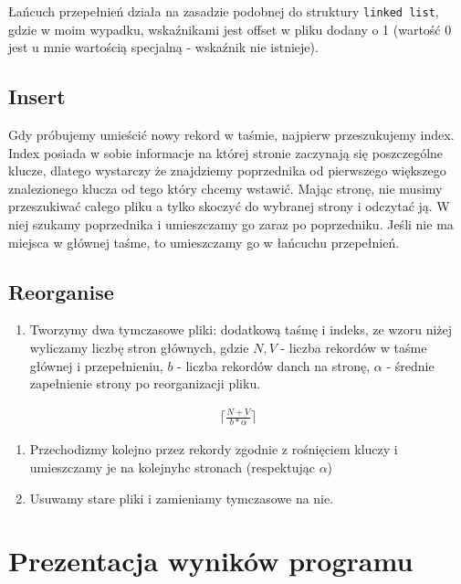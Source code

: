 \documentclass[
]{article}
\providecommand{\tightlist}{%
  \setlength{\itemsep}{0pt}\setlength{\parskip}{0pt}}
\begin{document}
Łańcuch przepełnień działa na zasadzie podobnej do struktury
\texttt{linked\ list}, gdzie w moim wypadku, wskaźnikami jest offset w
pliku dodany o 1 (wartość 0 jest u mnie wartością specjalną - wskaźnik
nie istnieje).

\subsection{Insert}\label{insert}

Gdy próbujemy umieścić nowy rekord w taśmie, najpierw przeszukujemy
index. Index posiada w sobie informacje na której stronie zaczynają się
poszczególne klucze, dlatego wystarczy że znajdziemy poprzednika od
pierwszego większego znalezionego klucza od tego który chcemy wstawić.
Mając stronę, nie musimy przeszukiwać całego pliku a tylko skoczyć do
wybranej strony i odczytać ją. W niej szukamy poprzednika i umieszczamy
go zaraz po poprzedniku. Jeśli nie ma miejsca w głównej taśme, to
umieszczamy go w łańcuchu przepełnień.

\subsection{Reorganise}\label{reorganise}

\begin{enumerate}
\def\labelenumi{\arabic{enumi}.}
\tightlist
\item
  Tworzymy dwa tymczasowe pliki: dodatkową taśmę i indeks, ze wzoru
  niżej wyliczamy liczbę stron głównych, gdzie \(N,V\) - liczba rekordów
  w taśme głównej i przepełnieniu, \(b\) - liczba rekordów danch na
  stronę, \(\alpha\) - średnie zapełnienie strony po reorganizacji
  pliku.
\end{enumerate}

\begin{align}
\lceil \frac{N+V}{b* \alpha }\rceil
\end{align}

\begin{enumerate}
\def\labelenumi{\arabic{enumi}.}
\setcounter{enumi}{1}
\item
  Przechodizmy kolejno przez rekordy zgodnie z rośnięciem kluczy i
  umieszczamy je na kolejnyhc stronach (respektując \(\alpha\))
\item
  Usuwamy stare pliki i zamieniamy tymczasowe na nie.
\end{enumerate}

\section{Prezentacja wyników
programu}\label{prezentacja-wynikuxf3w-programu}
\end{document}
